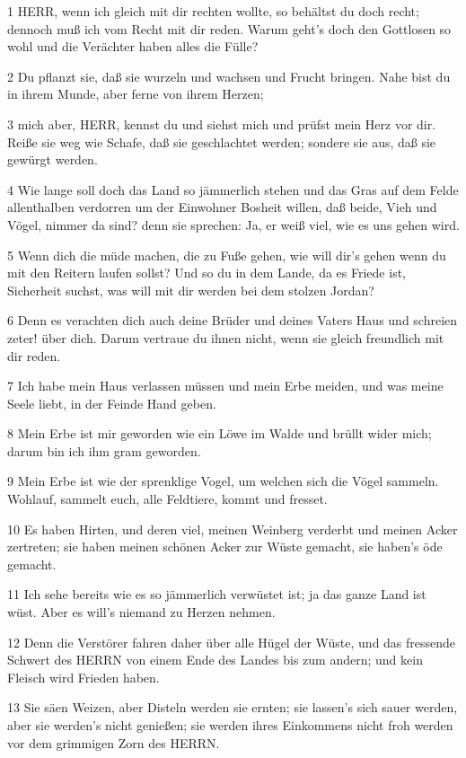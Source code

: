 \par 1 HERR, wenn ich gleich mit dir rechten wollte, so behältst du doch recht; dennoch muß ich vom Recht mit dir reden. Warum geht's doch den Gottlosen so wohl und die Verächter haben alles die Fülle?
\par 2 Du pflanzt sie, daß sie wurzeln und wachsen und Frucht bringen. Nahe bist du in ihrem Munde, aber ferne von ihrem Herzen;
\par 3 mich aber, HERR, kennst du und siehst mich und prüfst mein Herz vor dir. Reiße sie weg wie Schafe, daß sie geschlachtet werden; sondere sie aus, daß sie gewürgt werden.
\par 4 Wie lange soll doch das Land so jämmerlich stehen und das Gras auf dem Felde allenthalben verdorren um der Einwohner Bosheit willen, daß beide, Vieh und Vögel, nimmer da sind? denn sie sprechen: Ja, er weiß viel, wie es uns gehen wird.
\par 5 Wenn dich die müde machen, die zu Fuße gehen, wie will dir's gehen wenn du mit den Reitern laufen sollst? Und so du in dem Lande, da es Friede ist, Sicherheit suchst, was will mit dir werden bei dem stolzen Jordan?
\par 6 Denn es verachten dich auch deine Brüder und deines Vaters Haus und schreien zeter! über dich. Darum vertraue du ihnen nicht, wenn sie gleich freundlich mit dir reden.
\par 7 Ich habe mein Haus verlassen müssen und mein Erbe meiden, und was meine Seele liebt, in der Feinde Hand geben.
\par 8 Mein Erbe ist mir geworden wie ein Löwe im Walde und brüllt wider mich; darum bin ich ihm gram geworden.
\par 9 Mein Erbe ist wie der sprenklige Vogel, um welchen sich die Vögel sammeln. Wohlauf, sammelt euch, alle Feldtiere, kommt und fresset.
\par 10 Es haben Hirten, und deren viel, meinen Weinberg verderbt und meinen Acker zertreten; sie haben meinen schönen Acker zur Wüste gemacht, sie haben's öde gemacht.
\par 11 Ich sehe bereits wie es so jämmerlich verwüstet ist; ja das ganze Land ist wüst. Aber es will's niemand zu Herzen nehmen.
\par 12 Denn die Verstörer fahren daher über alle Hügel der Wüste, und das fressende Schwert des HERRN von einem Ende des Landes bis zum andern; und kein Fleisch wird Frieden haben.
\par 13 Sie säen Weizen, aber Disteln werden sie ernten; sie lassen's sich sauer werden, aber sie werden's nicht genießen; sie werden ihres Einkommens nicht froh werden vor dem grimmigen Zorn des HERRN.
